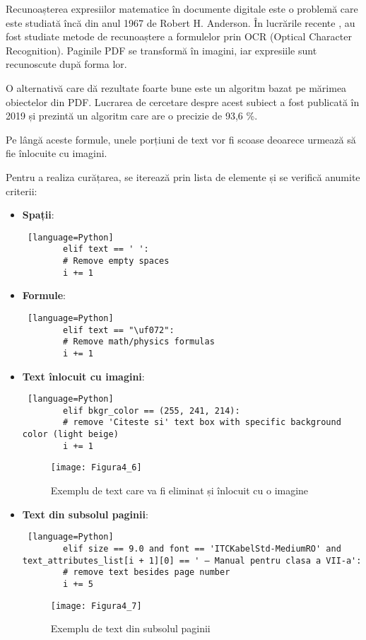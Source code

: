 Recunoașterea expresiilor matematice în documente digitale este o problemă care este studiată încă din anul 1967 \cite{anderson1967syntax} de Robert H. Anderson. În lucrările recente \cite{baker2010faithful}, au fost studiate metode de recunoaștere a formulelor prin OCR (Optical Character Recognition). Paginile PDF se transformă în imagini, iar expresiile sunt recunoscute după forma lor.

O alternativă care dă rezultate foarte bune este un algoritm  bazat pe mărimea obiectelor din PDF. Lucrarea \cite{wang2019extraction} de cercetare despre acest subiect a fost publicată în 2019 și prezintă un algoritm care are o precizie de 93,6 \%.

Pe lângă aceste formule, unele porțiuni de text vor fi scoase deoarece urmează să fie înlocuite cu imagini.

Pentru a realiza curățarea, se iterează prin lista de elemente și se verifică anumite criterii:
\begin{itemize}
	\item \textbf{Spații}:
	\begin{lstlisting} [language=Python]
		elif text == ' ':
		# Remove empty spaces
		i += 1\end{lstlisting}
	
	\item \textbf{Formule}:
	\begin{lstlisting} [language=Python]
		elif text == "\uf072":
		# Remove math/physics formulas
		i += 1\end{lstlisting}
	\item \textbf{Text înlocuit cu imagini}:
	\begin{lstlisting} [language=Python]
		elif bkgr_color == (255, 241, 214):
		# remove 'Citeste si' text box with specific background color (light beige)
		i += 1\end{lstlisting}
	\begin{figure}[H]
		\centering
		\texttt{[image: Figura4\_6]}
		\caption{Exemplu de text care va fi eliminat și înlocuit cu o imagine}
		\label{fig:Figura4_6}
	\end{figure}
	\vspace{8em}
	\item \textbf{Text din subsolul paginii}:
	\begin{lstlisting} [language=Python]
		elif size == 9.0 and font == 'ITCKabelStd-MediumRO' and text_attributes_list[i + 1][0] == ' – Manual pentru clasa a VII-a':
		# remove text besides page number
		i += 5\end{lstlisting}
	\begin{figure}[H]
		\centering
		\texttt{[image: Figura4\_7]}
		\caption{Exemplu de text din subsolul paginii}
		\label{fig:Figura4_7}
	\end{figure}
\end{itemize}

